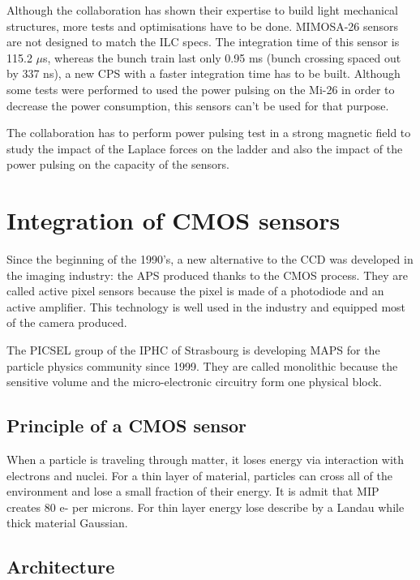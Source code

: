     Although the collaboration has shown their expertise to build light mechanical structures, more tests and optimisations have to be done.
    MIMOSA-26 sensors are not designed to match the \gls{ILC} specs. 
    The integration time of this sensor is 115.2 $\mu$s, whereas the bunch train last only 0.95 ms (bunch crossing spaced out by 337 ns), a new CPS with a faster integration time has to be built.
    Although some tests were performed to used the power pulsing on the Mi-26 in order to decrease the power consumption, this sensors can't be used for that purpose.  

    The collaboration has to perform power pulsing test in a strong magnetic field to study the impact of the Laplace forces on the ladder and also the impact of the power pulsing on the capacity of the sensors.

  
  \section{Integration of CMOS sensors}
  \label{sec:CMOS}

  Since the beginning of the 1990's, a new alternative to the \gls{CCD} was developed in the imaging industry: the \gls{APS} produced thanks to the \gls{CMOS} process.
  They are called active pixel sensors because the pixel is made of a photodiode  and an active amplifier. 
  This technology is well used in the industry and equipped most of the camera produced.

  The PICSEL group of the IPHC of Strasbourg is developing \gls{MAPS} for the particle physics community since 1999.
  They are called monolithic because the sensitive volume and the micro-electronic circuitry form one physical block.

  
    \subsection{Principle of a CMOS sensor}

    When a particle is traveling through matter, it loses energy via interaction with electrons and nuclei.
    For a thin layer of material, particles can cross all of the environment and lose a small fraction of their energy.
    It is admit that \gls{MIP} creates 80 e- per microns. 
    For thin layer energy lose describe by a Landau while thick material Gaussian.

    \subsection{Architecture}
    

